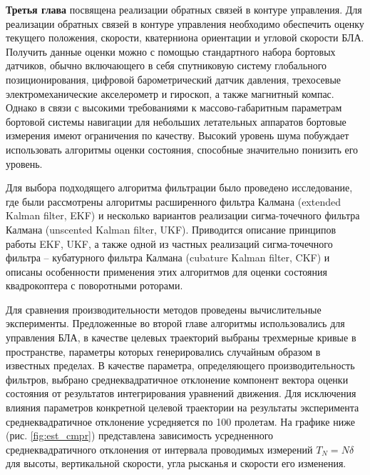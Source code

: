 \textbf{Третья глава} посвящена реализации обратных связей в контуре управления. Для реализации обратных связей в контуре управления необходимо обеспечить оценку текущего положения, скорости, кватерниона ориентации и угловой скорости БЛА. Получить данные оценки можно с помощью стандартного набора бортовых датчиков, обычно включающего в себя спутниковую систему глобального позиционирования, цифровой барометрический датчик давления, трехосевые электромеханические акселерометр и гироскоп, а также магнитный компас. Однако в связи с высокими требованиями к массово-габаритным параметрам бортовой системы навигации для небольших летательных аппаратов бортовые измерения имеют ограничения по качеству. Высокий уровень шума побуждает использовать алгоритмы оценки состояния, способные значительно понизить его уровень.

Для выбора подходящего алгоритма фильтрации было проведено исследование, где были рассмотрены  алгоритмы расширенного фильтра Калмана (extended Kalman filter, EKF) и несколько вариантов реализации сигма-точечного фильтра Калмана (unscented Kalman filter, UKF). Приводится описание принципов работы EKF, UKF, а также одной из частных реализаций сигма-точечного фильтра -- кубатурного фильтра Калмана (cubature Kalman filter, CKF) и описаны особенности применения этих алгоритмов для оценки состояния квадрокоптера с поворотными роторами.

Для сравнения производительности методов проведены вычислительные эксперименты.
Предложенные во второй главе алгоритмы использовались для управления БЛА, в качестве целевых траекторий выбраны трехмерные кривые в пространстве, параметры которых генерировались случайным образом в известных пределах. В качестве параметра, определяющего производительность фильтров,
выбрано среднеквадратичное отклонение компонент вектора оценки состояния от результатов интегрирования уравнений движения.
Для исключения влияния параметров конкретной целевой траектории на результаты эксперимента среднеквадратичное отклонение усредняется по 100 пролетам.
На графике ниже (рис. \ref{fig:est_cmpr}) представлена зависимость усредненного среднеквадратичного отклонения от интервала проводимых измерений $T_N = N\delta$ для высоты, вертикальной скорости, угла рысканья и скорости его изменения.

